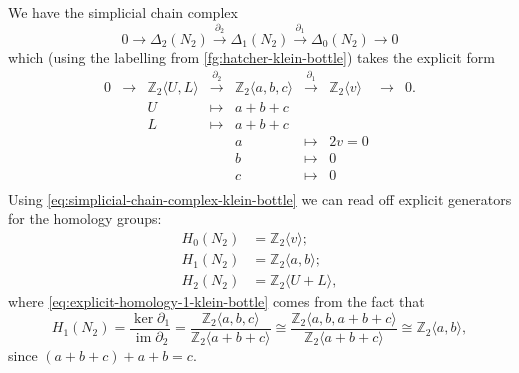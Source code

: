 \documentclass[12pt]{article}
\numberwithin{equation}{subsection}
\numberwithin{theorem}{subsection}
\numberwithin{lemma}{subsection}
\numberwithin{corollary}{subsection}
\numberwithin{definition}{subsection}
\numberwithin{example}{subsection}
\numberwithin{note}{subsection}
\newcommand{\zz}{\mathbb{Z}}
\DeclareMathOperator{\im}{im}
\begin{document}
            We have the simplicial chain complex
            \begin{equation*}
                0\to\Delta_2(N_2)\xrightarrow{\partial_2}\Delta_1(N_2)\xrightarrow{\partial_1}\Delta_0(N_2)\to0
            \end{equation*}
            which (using the labelling from \cref{fg:hatcher-klein-bottle}) takes the explicit form
            \begin{equation}\label{eq:simplicial-chain-complex-klein-bottle}
                \begin{array}{cccccccccc}
                    0 &\to &\zz_2\langle U,L\rangle &\xrightarrow{\partial_2} &\zz_2\langle a,b,c\rangle &\xrightarrow{\partial_1} &\zz_2\langle v\rangle &\to &0.\\[0.3em]
                    & &U &\mapsto &a+b+c & & & &\\
                    & &L &\mapsto &a+b+c & & & &\\
                    & & & &a &\mapsto &2v=0 & &\\
                    & & & &b &\mapsto &0 & &\\
                    & & & &c &\mapsto &0 & &\\
                \end{array}
            \end{equation}
            Using \cref{eq:simplicial-chain-complex-klein-bottle} we can read off explicit generators for the homology groups:
            \begin{align}
                H_0(N_2) &= \zz_2\langle v\rangle;\\
                H_1(N_2) &= \zz_2\langle a,b\rangle;\label{eq:explicit-homology-1-klein-bottle}\\
                H_2(N_2) &= \zz_2\langle U+L\rangle,
            \end{align}
            where \cref{eq:explicit-homology-1-klein-bottle} comes from the fact that
            \begin{equation*}
                H_1(N_2) = \frac{\ker\partial_1}{\im\partial_2} = \frac{\zz_2\langle a,b,c\rangle}{\zz_2\langle a+b+c\rangle} \cong \frac{\zz_2\langle a,b,a+b+c\rangle}{\zz_2\langle a+b+c\rangle} \cong \zz_2\langle a,b\rangle,
            \end{equation*}
            since $(a+b+c)+a+b=c$.


\end{document}

